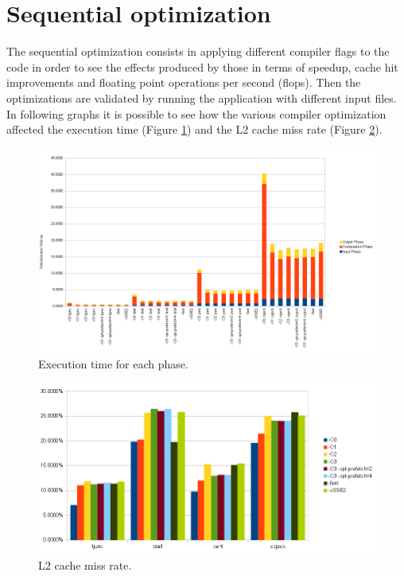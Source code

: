 \documentclass[12pt, a4paper]{article}
\begin{document}
\section{Sequential optimization}
The sequential optimization consists in applying different compiler flags to
the code in order to see the effects produced by those in terms of speedup,
cache hit improvements and floating point operations per second (flops).
Then the optimizations are validated by running the application with different
input files.
In following graphs it is possible to see how the various compiler optimization
affected the execution time (Figure \ref{fig:exec_time}) and the L2 cache miss 
rate (Figure \ref{fig:cache_misses}).
\begin{figure}[h]
  \begin{centering}
    \includegraphics[width=1\textwidth]{figures/exec_time.png}
    \par\end{centering}
  \caption{Execution time for each phase. \label{fig:exec_time}}
\end{figure}

\begin{figure}[h]
  \begin{centering}
    \includegraphics[width=1\textwidth]{figures/cache.png}
    \par\end{centering}
  \caption{L2 cache miss rate. \label{fig:cache_misses}}
\end{figure}
\end{document}
